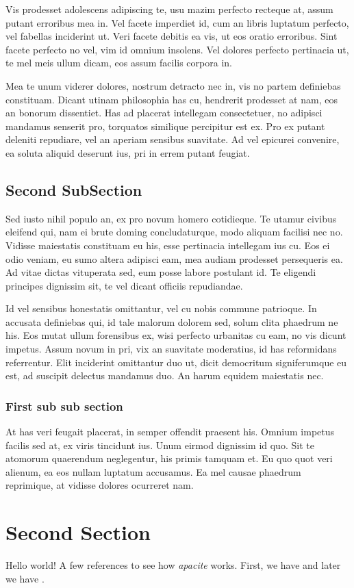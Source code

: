 Vis prodesset adolescens adipiscing te, usu mazim perfecto recteque at, assum putant erroribus mea in. Vel facete imperdiet id, cum an libris luptatum perfecto, vel fabellas inciderint ut. Veri facete debitis ea vis, ut eos oratio erroribus. Sint facete perfecto no vel, vim id omnium insolens. Vel dolores perfecto pertinacia ut, te mel meis ullum dicam, eos assum facilis corpora in.

Mea te unum viderer dolores, nostrum detracto nec in, vis no partem definiebas constituam. Dicant utinam philosophia has cu, hendrerit prodesset at nam, eos an bonorum dissentiet. Has ad placerat intellegam consectetuer, no adipisci mandamus senserit pro, torquatos similique percipitur est ex. Pro ex putant deleniti repudiare, vel an aperiam sensibus suavitate. Ad vel epicurei convenire, ea soluta aliquid deserunt ius, pri in errem putant feugiat.

\subsection{Second SubSection \label{sec:sub2}}
Sed iusto nihil populo an, ex pro novum homero cotidieque. Te utamur civibus eleifend qui, nam ei brute doming concludaturque, modo aliquam facilisi nec no. Vidisse maiestatis constituam eu his, esse pertinacia intellegam ius cu. Eos ei odio veniam, eu sumo altera adipisci eam, mea audiam prodesset persequeris ea. Ad vitae dictas vituperata sed, eum posse labore postulant id. Te eligendi principes dignissim sit, te vel dicant officiis repudiandae.

Id vel sensibus honestatis omittantur, vel cu nobis commune patrioque. In accusata definiebas qui, id tale malorum dolorem sed, solum clita phaedrum ne his. Eos mutat ullum forensibus ex, wisi perfecto urbanitas cu eam, no vis dicunt impetus. Assum novum in pri, vix an suavitate moderatius, id has reformidans referrentur. Elit inciderint omittantur duo ut, dicit democritum signiferumque eu est, ad suscipit delectus mandamus duo. An harum equidem maiestatis nec.

\subsubsection{First sub sub section \label{sec:subsub1}}
At has veri feugait placerat, in semper offendit praesent his. Omnium impetus facilis sed at, ex viris tincidunt ius. Unum eirmod dignissim id quo. Sit te atomorum quaerendum neglegentur, his primis tamquam et. Eu quo quot veri alienum, ea eos nullam luptatum accusamus. Ea mel causae phaedrum reprimique, at vidisse dolores ocurreret nam. \cite{lorem}

\section{Second Section \label{sec:sec2}}

Hello world! A few references to see how \textit{apacite} works. First, we have \cite{khaled2003} and later we have \cite{pullan2005}.